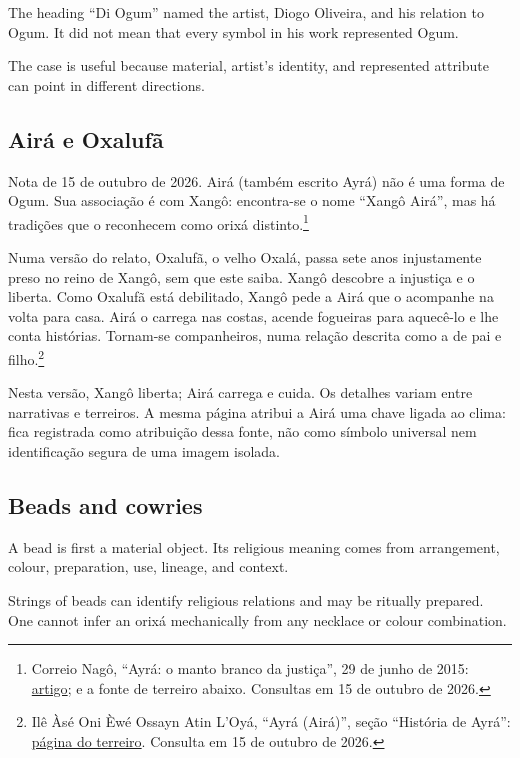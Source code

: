 The heading ``Di Ogum'' named the artist,
Diogo Oliveira, and his relation to Ogum.
It did not mean that every symbol in his
work represented Ogum.

The case is useful because material,
artist's identity, and represented attribute
can point in different directions.

\subsection{Airá e Oxalufã}
\label{religion-section-aira-oxalufa}

Nota de 15 de outubro de 2026.
Airá (também escrito Ayrá) não é uma
forma de Ogum. Sua associação é com
Xangô: encontra-se o nome “Xangô Airá”,
mas há tradições que o reconhecem como
orixá distinto.\footnote{
Correio Nagô, “Ayrá: o manto branco
da justiça”, 29 de junho de 2015:
\href{https://correionago.com.br/%
ayra-o-manto-branco-da-justica/}
{artigo}; e a fonte de terreiro abaixo.
Consultas em 15 de outubro de 2026.}

Numa versão do relato, Oxalufã, o velho
Oxalá, passa sete anos injustamente
preso no reino de Xangô, sem que este
saiba. Xangô descobre a injustiça e o
liberta. Como Oxalufã está debilitado,
Xangô pede a Airá que o acompanhe na
volta para casa. Airá o carrega nas
costas, acende fogueiras para aquecê-lo
e lhe conta histórias. Tornam-se
companheiros, numa relação descrita
como a de pai e filho.\footnote{
Ilê Àsé Oni Èwé Ossayn Atin L'Oyá,
“Ayrá (Airá)”, seção
“História de Ayrá”:
\href{https://www.bruxodailha.com.br/%
orixas/ayra/}{página do terreiro}.
Consulta em 15 de outubro de 2026.}

Nesta versão, Xangô liberta; Airá
carrega e cuida. Os detalhes variam
entre narrativas e terreiros.
A mesma página atribui a Airá uma chave
ligada ao clima: fica registrada como
atribuição dessa fonte, não como
símbolo universal nem identificação
segura de uma imagem isolada.

\subsection{Beads and cowries}
\label{religion-section-beads-cowries}

A bead is first a material object.  Its
religious meaning comes from arrangement,
colour, preparation, use, lineage, and
context.

Strings of beads can identify religious
relations and may be ritually prepared.
One cannot infer an orix\'a mechanically
from any necklace or colour combination.

